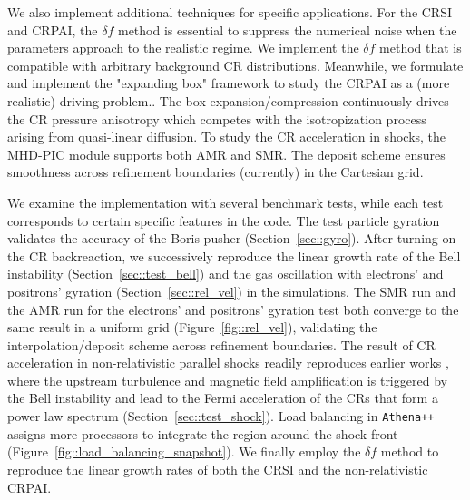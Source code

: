 \documentclass[fleqn,usenatbib]{mnras}
\begin{document}
We also implement additional techniques for specific applications. For the CRSI and CRPAI, the $\delta f$ method is essential to suppress the numerical noise when the parameters approach to the realistic regime. We implement the $\delta f$ method that is compatible with arbitrary background CR distributions. Meanwhile, we formulate and implement the "expanding box" framework to study the CRPAI as a (more realistic) driving problem.. The box expansion/compression continuously drives the CR pressure anisotropy which competes with the isotropization process arising from quasi-linear diffusion. To study the CR acceleration in shocks, the MHD-PIC module supports both AMR and SMR. The deposit scheme ensures smoothness across refinement boundaries (currently) in the Cartesian grid.

We examine the implementation with several benchmark tests, while each test corresponds to certain specific features in the code. The test particle gyration validates the accuracy of the Boris pusher (Section~\ref{sec::gyro}). After turning on the CR backreaction, we successively reproduce the linear growth rate of the Bell instability (Section~\ref{sec::test_bell}) and the gas oscillation with electrons’ and positrons’ gyration (Section~\ref{sec::rel_vel}) in the simulations. The SMR run and the AMR run for the electrons’ and positrons’ gyration test both converge to the same result in a uniform grid (Figure~\ref{fig::rel_vel}),
validating the interpolation/deposit scheme across refinement boundaries.
The result of CR acceleration in non-relativistic parallel shocks readily reproduces earlier works \citep[e.g. ][]{2015ApJ...809...55B, 2018MNRAS.473.3394V, 2018ApJ...859...13M}, where the upstream turbulence and magnetic field amplification is triggered by the Bell instability
and lead to the Fermi acceleration of the CRs that form a power law spectrum (Section~\ref{sec::test_shock}). Load balancing in \texttt{Athena++} assigns more processors to integrate the region around the shock front (Figure~\ref{fig::load_balancing_snapshot}).
We finally employ the $\delta f$ method to reproduce the linear growth rates of both the CRSI and the non-relativistic CRPAI.
\end{document}
